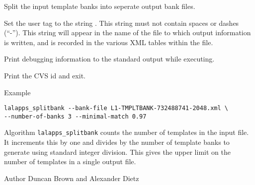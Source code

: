 \begin{entry}
\begin{entry}
\item[\option{--number-of-banks} \parm{n}] 
 Split the input template banks into  seperate output bank files.

\item[\option{--user-tag} \parm{comment}]
Set the user tag to the string .  This string must not
contain spaces or dashes (``-'').  This string will appear in the name of
the file to which output information is written, and is recorded in the
various XML tables within the file.

\item[\option{--verbose}]
Print debugging information to the
standard output while executing.

\item[\option{--version}]   
Print the CVS id and exit.

\end{entry}

\item[Example]
\begin{verbatim}
lalapps_splitbank --bank-file L1-TMPLTBANK-732488741-2048.xml \
--number-of-banks 3 --minimal-match 0.97
\end{verbatim}

\item[Algorithm]
\texttt{lalapps\_splitbank} counts the number of templates in the input file.
It increments this by one and divides by the number of template banks to
generate using standard integer division. This gives the upper limit on the
number of templates in a single output file.

\item[Author] 
Duncan Brown and Alexander Dietz
\end{entry}

